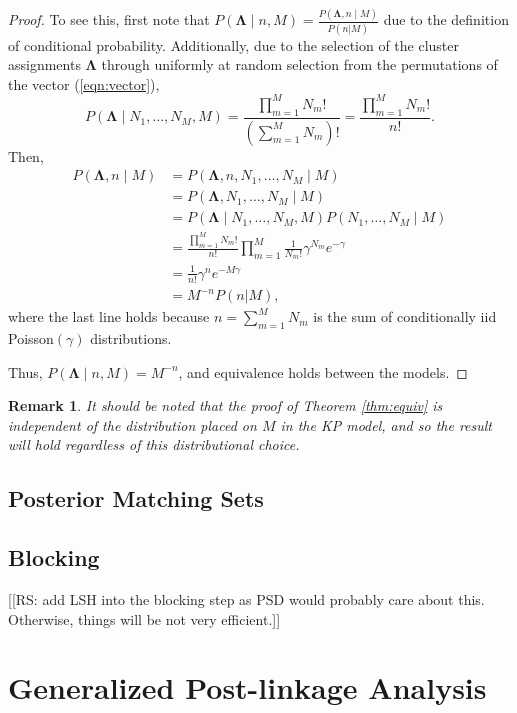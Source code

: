 \documentclass[11pt]{article}\usepackage[]{graphicx}\usepackage[]{color}
\newtheorem{remark}{Remark}
\begin{document}
\begin{proof}
To see this, first note that $P(\boldsymbol \Lambda \mid n, M) = \frac{P(\boldsymbol \Lambda, n \mid M)}{P(n|M)}$ due to the definition of conditional probability. Additionally, due to the selection of the cluster assignments $\boldsymbol \Lambda$ through uniformly at random selection from the permutations of the vector (\ref{eqn:vector}), 
$$
P(\boldsymbol \Lambda \mid N_1, \dots, N_M, M) = \frac{\prod\limits_{m = 1}^M N_m!}{\left(\sum\limits_{m = 1}^M N_m\right)!} = \frac{\prod\limits_{m = 1}^M N_m!}{n!}.
$$
Then,
\begin{align*}
P(\boldsymbol \Lambda, n \mid M) &= P(\boldsymbol \Lambda, n, N_1, \dots, N_M \mid M) \tag{Duplicate information} \\
&= P(\boldsymbol \Lambda, N_1, \dots, N_M \mid M) \tag{Duplicate information} \\
&= P(\boldsymbol \Lambda \mid N_1, \dots, N_M, M)P(N_1, \dots, N_M \mid M) \\
&= \frac{\prod\limits_{m = 1}^M N_m!}{n!} \prod\limits_{m = 1}^M \frac{1}{N_m!} \gamma^{N_m} e^{-\gamma} \\
&= \frac{1}{n!}\gamma^n e^{-M\gamma} \\
&= M^{-n}P(n|M),
\end{align*}
where the last line holds because $n = \sum_{m=1}^M N_m$ is the sum of conditionally iid Poisson$(\gamma)$ distributions.

Thus, $P(\boldsymbol \Lambda \mid n, M) = M^{-n}$, and equivalence holds between the models.
\end{proof}

\begin{remark}
It should be noted that the proof of Theorem \ref{thm:equiv} is independent of the distribution placed on $M$ in the KP model, and so the result will hold regardless of this distributional choice.
\end{remark}

\subsection{Posterior Matching Sets}

\subsection{Blocking}

[[RS: add LSH into the blocking step as PSD would probably care about this. Otherwise, things will be not very efficient.]]

\section{Generalized Post-linkage Analysis}
\label{sec:post-link}
\end{document}
